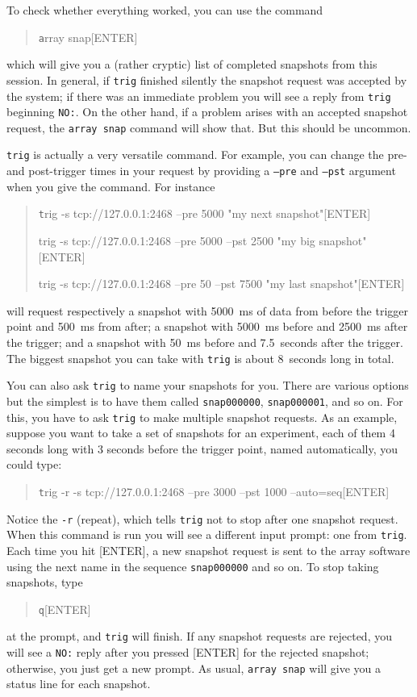 \documentclass[12pt]{article}
\begin{document}
To check whether everything worked, you can use the command
\begin{quotation}\texttt
      array snap[ENTER]
\end{quotation}
which will give you a (rather cryptic) list of completed snapshots
from this session.  In general, if \texttt{trig} finished silently the snapshot
request was accepted by the system; if there was an immediate problem
you will see a reply from \texttt{trig} beginning \texttt{NO:}.  On the other
hand, if a problem arises with an accepted snapshot request, the
\texttt{array snap} command will show that.  But this should be
uncommon.

\texttt{trig} is actually a very versatile command.  For example, you
can change the pre- and post-trigger times in your request by
providing a \texttt{--pre} and \texttt{--pst} argument when you give
the command.  For instance
\begin{quotation}\texttt
      trig -s tcp://127.0.0.1:2468 --pre 5000 "my next snapshot"[ENTER]

      trig -s tcp://127.0.0.1:2468 --pre 5000 --pst 2500 "my big snapshot"[ENTER]

      trig -s tcp://127.0.0.1:2468 --pre 50 --pst 7500 "my last snapshot"[ENTER]
\end{quotation}
will request respectively a snapshot with 5000~ms of data from before
the trigger point and 500~ms from after; a snapshot with 5000~ms
before and 2500~ms after the trigger; and a snapshot with 50~ms before
and 7.5~seconds after the trigger.  The biggest snapshot you can take
with \texttt{trig} is about 8~seconds long in total.

You can also ask \texttt{trig} to name your snapshots for you.  There are
various options but the simplest is to have them called
\texttt{snap000000}, \texttt{snap000001}, and so on.  For this, you
have to ask \texttt{trig} to make multiple snapshot requests.  As an example,
suppose you want to take a set of snapshots for an experiment, each of
them 4 seconds long with 3 seconds before the trigger point, named
automatically, you could type:
\begin{quotation}\texttt
      trig -r -s tcp://127.0.0.1:2468 --pre 3000 --pst 1000 --auto=seq[ENTER]
\end{quotation}
Notice the \texttt{-r} (repeat), which tells \texttt{trig} not to stop after one
snapshot request.  When this command is run you will see a different
input prompt: one from \texttt{trig}.  Each time you hit [ENTER], a
new snapshot request is sent to the array software using the next name
in the sequence \texttt{snap000000} and so on.  To stop taking
snapshots, type
\begin{quotation}\texttt
      q[ENTER]
\end{quotation}
at the prompt, and \texttt{trig} will finish.  If any snapshot requests are
rejected, you will see a \texttt{NO:} reply after you pressed [ENTER]
for the rejected snapshot; otherwise, you just get a new prompt.  As usual,
\texttt{array snap} will give you a status line for each snapshot.
\end{document}
